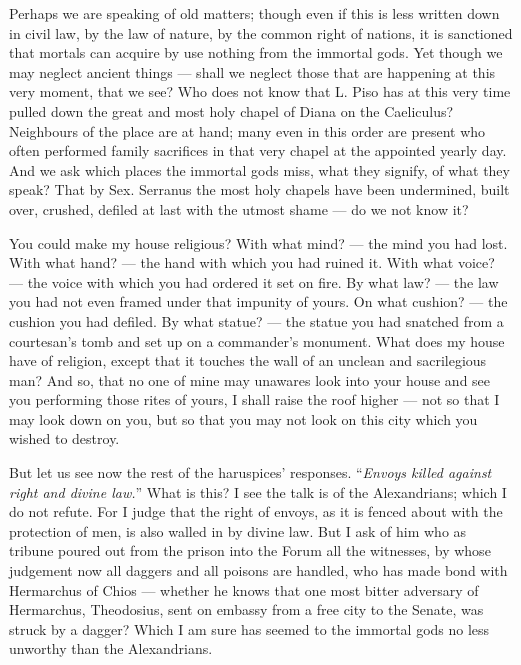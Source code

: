  Perhaps we are speaking of old matters; though even if this is less written down in civil law, by the law of nature, by the common right of nations, it is sanctioned that mortals can acquire by use nothing from the immortal gods. Yet though we may neglect ancient things --- shall we neglect those that are happening at this very moment, that we see? Who does not know that L. Piso has at this very time pulled down the great and most holy chapel of Diana on the Caeliculus? Neighbours of the place are at hand; many even in this order are present who often performed family sacrifices in that very chapel at the appointed yearly day. And we ask which places the immortal gods miss, what they signify, of what they speak? That by Sex. Serranus the most holy chapels have been undermined, built over, crushed, defiled at last with the utmost shame --- do we not know it?

 You could make my house religious? With what mind? --- the mind you had lost. With what hand? --- the hand with which you had ruined it. With what voice? --- the voice with which you had ordered it set on fire. By what law? --- the law you had not even framed under that impunity of yours. On what cushion? --- the cushion you had defiled. By what statue? --- the statue you had snatched from a courtesan's tomb and set up on a commander's monument. What does my house have of religion, except that it touches the wall of an unclean and sacrilegious man? And so, that no one of mine may unawares look into your house and see you performing those rites of yours, I shall raise the roof higher --- not so that I may look down on you, but so that you may not look on this city which you wished to destroy.

 But let us see now the rest of the haruspices' responses. ``\textit{Envoys killed against right and divine law.}'' What is this? I see the talk is of the Alexandrians; which I do not refute. For I judge that the right of envoys, as it is fenced about with the protection of men, is also walled in by divine law. But I ask of him who as tribune poured out from the prison into the Forum all the witnesses, by whose judgement now all daggers and all poisons are handled, who has made bond with Hermarchus of Chios --- whether he knows that one most bitter adversary of Hermarchus, Theodosius, sent on embassy from a free city to the Senate, was struck by a dagger? Which I am sure has seemed to the immortal gods no less unworthy than the Alexandrians.

